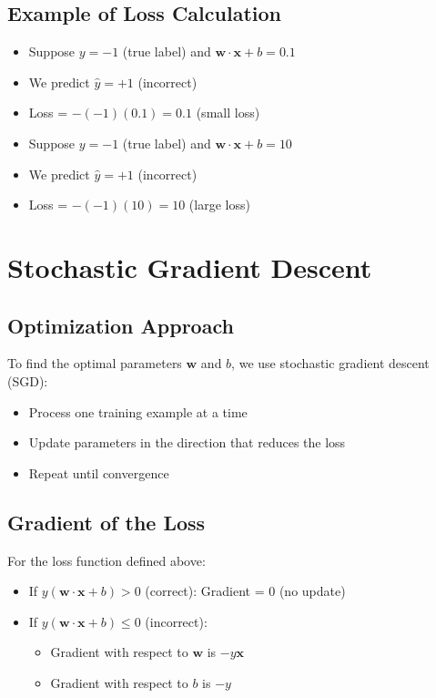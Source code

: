 \documentclass{article}
\begin{document}
\subsection{Example of Loss Calculation}
\begin{itemize}
    \item Suppose $y = -1$ (true label) and $\mathbf{w} \cdot \mathbf{x} + b = 0.1$
    \item We predict $\hat{y} = +1$ (incorrect)
    \item Loss = $-(-1)(0.1) = 0.1$ (small loss)
\end{itemize}

\begin{itemize}
    \item Suppose $y = -1$ (true label) and $\mathbf{w} \cdot \mathbf{x} + b = 10$
    \item We predict $\hat{y} = +1$ (incorrect)
    \item Loss = $-(-1)(10) = 10$ (large loss)
\end{itemize}

\section{Stochastic Gradient Descent}

\subsection{Optimization Approach}
To find the optimal parameters $\mathbf{w}$ and $b$, we use stochastic gradient descent (SGD):
\begin{itemize}
    \item Process one training example at a time
    \item Update parameters in the direction that reduces the loss
    \item Repeat until convergence
\end{itemize}

\subsection{Gradient of the Loss}
For the loss function defined above:
\begin{itemize}
    \item If $y(\mathbf{w} \cdot \mathbf{x} + b) > 0$ (correct): Gradient = 0 (no update)
    \item If $y(\mathbf{w} \cdot \mathbf{x} + b) \leq 0$ (incorrect):
    \begin{itemize}
        \item Gradient with respect to $\mathbf{w}$ is $-y\mathbf{x}$
        \item Gradient with respect to $b$ is $-y$
    \end{itemize}
\end{itemize}
\end{document}
